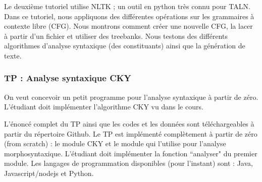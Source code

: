 \documentclass{KodeBook}
\begin{document}
Le deuxième tutoriel utilise NLTK ; un outil en python très connu pour TALN.
Dans ce tutoriel, nous appliquons des différentes opérations sur les grammaires à contexte libre (CFG).
Nous montrons comment créer une nouvelle CFG, la lacer à partir d'un fichier et utiliser des treebanks.
Nous testons des différents algorithmes d'analyse syntaxique (des constituants) ainsi que la génération de texte.


\subsubsection*{TP : Analyse syntaxique CKY}

On veut concevoir un petit programme pour l'analyse syntaxique à partir de zéro. 
L'étudiant doit implémenter l'algorithme CKY vu dans le cours.

L'énoncé complet du TP ainsi que les codes et les données sont téléchargeables à partir du répertoire Github.
Le TP est implémenté complètement à partir de zéro (from scratch) : le module CKY et le module qui l'utilise pour l'analyse morphosyntaxique. 
L'étudiant doit implémenter la fonction ``analyser" du premier module.
Les langages de programmation disponibles (pour l'instant) sont : Java, Javascript/nodejs et Python.

%
%
% 


\ifx\wholebook\relax\else
	
\end{document}
